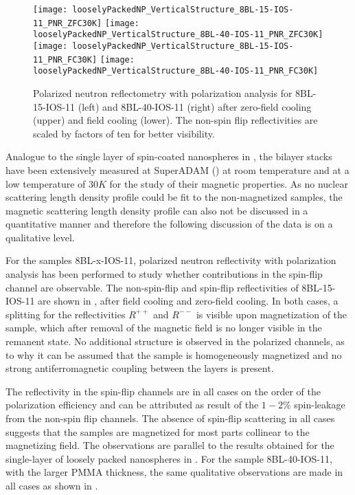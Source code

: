 \documentclass[\main/dresen_thesis.tex]{subfiles}
\begin{document}
  \label{sec:looselyPackedNS:bilayerStacks:pnr}

  \begin{figure}[tb]
    \centering
    \texttt{[image: looselyPackedNP\_VerticalStructure\_8BL-15-IOS-11\_PNR\_ZFC30K]}
    \texttt{[image: looselyPackedNP\_VerticalStructure\_8BL-40-IOS-11\_PNR\_ZFC30K]}
    \texttt{[image: looselyPackedNP\_VerticalStructure\_8BL-15-IOS-11\_PNR\_FC30K]}
    \texttt{[image: looselyPackedNP\_VerticalStructure\_8BL-40-IOS-11\_PNR\_FC30K]}
    \caption{\label{fig:looselyPackedNP:bilayer:pnr:8BL-x-IOS11}Polarized neutron reflectometry with polarization analysis for 8BL-15-IOS-11 (left) and 8BL-40-IOS-11 (right) after zero-field cooling (upper) and field cooling (lower). The non-spin flip reflectivities are scaled by factors of ten for better visibility. }
  \end{figure}

  Analogue to the single layer of spin-coated nanospheres in , the bilayer stacks have been extensively measured at SuperADAM () at room temperature and at a low temperature of $30 \unit{K}$ for the study of their magnetic properties.
  As no nuclear scattering length density profile could be fit to the non-magnetized samples, the magnetic scattering length density profile can also not be discussed in a quantitative manner and therefore the following discussion of the data is on a qualitative level.

  For the samples 8BL-x-IOS-11, polarized neutron reflectivity with polarization analysis has been performed to study whether contributions in the spin-flip channel are observable.
  The non-spin-flip and spin-flip reflectivities of 8BL-15-IOS-11 are shown in , after field cooling and zero-field cooling.
  In both cases, a splitting for the reflectivities $R^{++}$ and $R^{--}$ is visible upon magnetization of the sample, which after removal of the magnetic field is no longer visible in the remanent state.
  No additional structure is observed in the polarized channels, as to why it can be assumed that the sample is homogeneously magnetized and no strong antiferromagnetic coupling between the layers is present.

  The reflectivity in the spin-flip channels are in all cases on the order of the polarization efficiency and can be attributed as result of the $1 - 2 \%$ spin-leakage from the non-spin flip channels.
  The absence of spin-flip scattering in all cases suggests that the samples are magnetized for most parts collinear to the magnetizing field.
  The observations are parallel to the results obtained for the single-layer of loosely packed nanospheres in .
  For the sample 8BL-40-IOS-11, with the larger PMMA thickness, the same qualitative observations are made in all cases as shown in .
\end{document}
